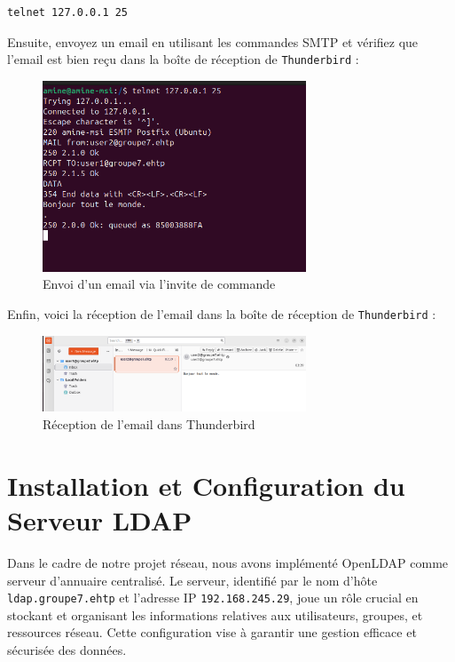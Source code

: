 \begin{lstlisting}[language=bash]
telnet 127.0.0.1 25
\end{lstlisting}

Ensuite, envoyez un email en utilisant les commandes SMTP et vérifiez que l'email est bien reçu dans la boîte de réception de \texttt{Thunderbird} :
\newpage

\begin{figure}[h]
	\centering
	\includegraphics[width=0.7\textwidth]{SMTP/toto.png}
	\caption{Envoi d'un email via l'invite de commande}
	\label{fig:cmd}
\end{figure}

Enfin, voici la réception de l'email dans la boîte de réception de \texttt{Thunderbird} :

\begin{figure}[h]
	\centering
	\includegraphics[width=0.7\textwidth]{SMTP/rcpt.png}
	\caption{Réception de l'email dans Thunderbird}
	\label{fig:cmd}
\end{figure}
	\newpage
\section{Installation et Configuration du Serveur LDAP}

Dans le cadre de notre projet réseau, nous avons implémenté OpenLDAP comme serveur d'annuaire centralisé. Le serveur, identifié par le nom d'hôte \texttt{ldap.groupe7.ehtp} et l'adresse IP \texttt{192.168.245.29}, joue un rôle crucial en stockant et organisant les informations relatives aux utilisateurs, groupes, et ressources réseau. Cette configuration vise à garantir une gestion efficace et sécurisée des données.

